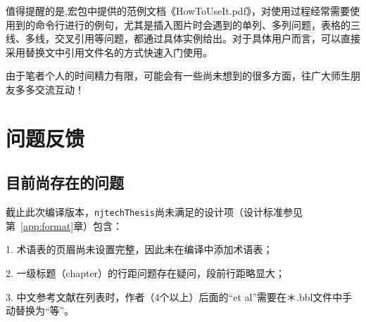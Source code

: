 值得提醒的是,宏包中提供的范例文档《HowToUseIt.pdf》，对使用过程经常需要使用到的命令行进行的例句，尤其是插入图片时会遇到的单列、多列问题，表格的三线、多线，交叉引用等问题，都通过具体实例给出。对于具体用户而言，可以直接采用替换文中引用文件名的方式快速入门使用。

由于笔者个人的时间精力有限，可能会有一些尚未想到的很多方面，往广大师生朋友多多交流互动！

\section{问题反馈}
\label{sec:FandQ}

\subsection{目前尚存在的问题}
\label{sec:remainingProblem}
截止此次编译版本，\texttt{njtechThesis}尚未满足的设计项（设计标准参见第~\ref{app:format}章）包含：

1. 术语表的页眉尚未设置完整，因此未在编译中添加术语表；

2. 一级标题（chapter）的行距问题存在疑问，段前行距略显大；

3. 中文参考文献在列表时，作者（4个以上）后面的“et al”需要在＊.bbl文件中手动替换为“等”。


